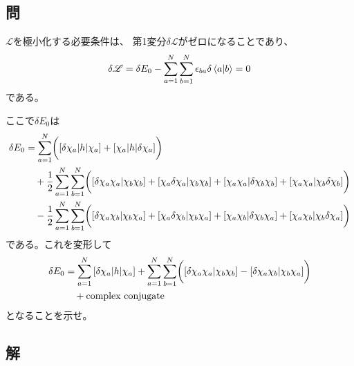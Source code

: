 \subsection{問}
$\mathscr{L}$を極小化する必要条件は、
第1変分$\delta\mathscr{L}$がゼロになることであり、
\begin{align}
	\delta\mathscr{L}
=
	\delta E_0
	-
	\sum_{a=1}^{N}
	\sum_{b=1}^{N}
		\epsilon_{ba} \delta \braket{a|b}
=
	0
\end{align}
である。

ここで$\delta E_0$は
\begin{align}
	\delta E_0
&=
	\sum_{a=1}^{N}\biggl(
		{[\delta\chi_a|h|\chi_a]}
		+
		{[\chi_a|h|\delta\chi_a]}
	\biggr) \nonumber \\ &\quad
	+
	\frac{1}{2}
	\sum_{a=1}^{N}
	\sum_{b=1}^{N}\biggl(
		{[\delta\chi_a\chi_a|\chi_b\chi_b]}
		+
		{[\chi_a\delta\chi_a|\chi_b\chi_b]}
		+
		{[\chi_a\chi_a|\delta\chi_b\chi_b]}
		+
		{[\chi_a\chi_a|\chi_b\delta\chi_b]}
	\biggr) \nonumber \\ &\quad
	-
	\frac{1}{2}
	\sum_{a=1}^{N}
	\sum_{b=1}^{N}\biggl(
		{[\delta\chi_a\chi_b|\chi_b\chi_a]}
		+
		{[\chi_a\delta\chi_b|\chi_b\chi_a]}
		+
		{[\chi_a\chi_b|\delta\chi_b\chi_a]}
		+
		{[\chi_a\chi_b|\chi_b\delta\chi_a]}
	\biggr)
\end{align}
である。これを変形して
\begin{align}
	\delta E_0
&=
	\sum_{a=1}^{N}
		{[\delta\chi_a|h|\chi_a]}
	+
	\sum_{a=1}^{N}
	\sum_{b=1}^{N}\biggl(
		{[\delta\chi_a\chi_a|\chi_b\chi_b]}
		-
		{[\delta\chi_a\chi_b|\chi_b\chi_a]}
	\biggr) \nonumber \\ &\quad
	+
	\text{complex conjugate}
\end{align}
となることを示せ。

\subsection{解}




